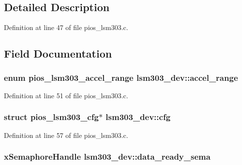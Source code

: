 \subsection{\-Detailed \-Description}


\-Definition at line 47 of file pios\-\_\-lsm303.\-c.



\subsection{\-Field \-Documentation}
\hypertarget{structlsm303__dev_a925acad41a5880d09927a1d63130e055}{
\subsubsection[{accel\-\_\-range}]{\setlength{\rightskip}{0pt plus 5cm}enum {\bf pios\-\_\-lsm303\-\_\-accel\-\_\-range} {\bf lsm303\-\_\-dev\-::accel\-\_\-range}}}\label{structlsm303__dev_a925acad41a5880d09927a1d63130e055}


\-Definition at line 51 of file pios\-\_\-lsm303.\-c.

\hypertarget{structlsm303__dev_ad5dc8f3a8d9729f36b59e641a907c232}{
\subsubsection[{cfg}]{\setlength{\rightskip}{0pt plus 5cm}struct {\bf pios\-\_\-lsm303\-\_\-cfg}$\ast$ {\bf lsm303\-\_\-dev\-::cfg}}}\label{structlsm303__dev_ad5dc8f3a8d9729f36b59e641a907c232}


\-Definition at line 57 of file pios\-\_\-lsm303.\-c.

\hypertarget{structlsm303__dev_ab14a7b6518eb1699835c6d284425a6bb}{
\subsubsection[{data\-\_\-ready\-\_\-sema}]{\setlength{\rightskip}{0pt plus 5cm}x\-Semaphore\-Handle {\bf lsm303\-\_\-dev\-::data\-\_\-ready\-\_\-sema}}}\label{structlsm303__dev_ab14a7b6518eb1699835c6d284425a6bb}


